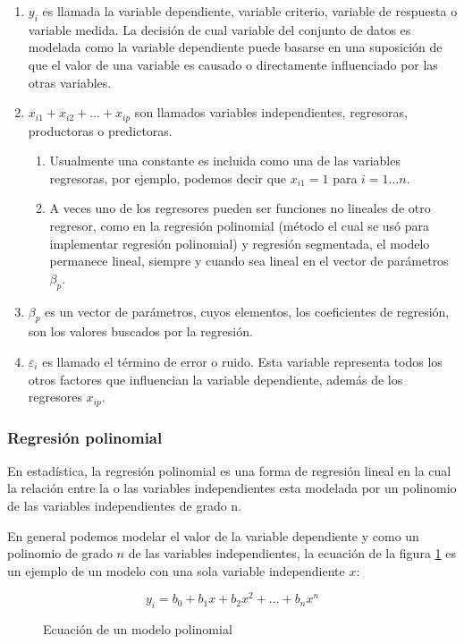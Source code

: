 \begin{enumerate}
	\item $y_i$ es llamada la variable dependiente, variable criterio, variable de respuesta o variable medida. La decisión de cual variable del conjunto de datos es modelada como la variable dependiente puede basarse en una suposición de que el valor de una variable es causado o directamente influenciado por las otras variables.
	
	\item $x_{i1} + x_{i2}+...+x_{ip}$ son llamados variables independientes, regresoras, productoras o predictoras.
	\begin{enumerate}
		\item Usualmente una constante es incluida como una de las variables regresoras, por ejemplo, podemos decir que $x_{i1} = 1$ para  $i =1...n$.
		\item A veces uno de los regresores pueden ser funciones no lineales de otro regresor, como en la regresión polinomial (método el cual se usó para implementar regresión polinomial) y regresión segmentada, el modelo permanece lineal, siempre y cuando sea lineal en el vector de parámetros $\beta_p$.
	\end{enumerate}
	\item $\beta_p$ es un vector de parámetros, cuyos elementos, los coeficientes de regresión, son los valores buscados por la regresión.
	\item $\varepsilon_i$ es llamado el término de error o ruido. Esta variable representa todos los otros factores que influencian la variable dependiente, además de los regresores $x_{ip}$.
\end{enumerate}
\subsubsection{Regresión polinomial}

En estadística, la regresión polinomial es una forma de regresión lineal en la cual la relación entre la o las variables independientes esta modelada por un polinomio de las variables independientes de grado n.

En general podemos modelar el valor de la variable dependiente y como un polinomio de grado $n$ de las variables independientes, la ecuación de la figura \ref{ec:regresionPolinomial} es un ejemplo de un modelo con una sola variable independiente $x$:
 
\begin{figure}
\[ y_i=b_0 + b_1x + b_2x^{2}+...+b_nx^{n} \]
\caption{Ecuación de un modelo polinomial}
\label{ec:regresionPolinomial}
\end{figure}

